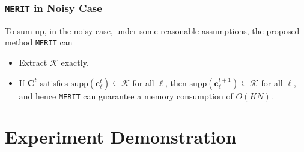 \documentclass[10pt,xcolor={usenames,dvipsnames,table}]{beamer}
\newcommand\coolover[2]{\mathrlap{\smash{\overbrace{\phantom{%
    \begin{matrix} #2 \end{matrix}}}^{\mbox{$#1$}}}}#2}
\newcommand{\tikzmarkx}[2]{\tikz[overlay,remember picture,
  baseline=(#1.base)] \node (#1) {#2};}
\newcommand{\Highlight}[1][submatrix]{%
    \tikz[overlay,remember picture]{
    \node[highlight,fit=(left.north west) (right.south east)] (#1) {};}
}
\begin{document}
%



\begin{frame}
    \frametitle{\texttt{MERIT} in Noisy Case}
    To sum up, in the noisy case, under some reasonable assumptions, the proposed method \texttt{MERIT} can
    \begin{itemize}
        \item Extract $\mathcal{K}$ exactly.
        \item If $\bm{C}^{t}$ satisfies $\text{supp}(\bm{c}_\ell^{t}) \subseteq \mathcal{K}$ for all $\ell$, then $\text{supp}(\bm{c}_\ell^{t+1}) \subseteq \mathcal{K}$ for all $\ell$, and hence \texttt{MERIT} can guarantee a memory consumption of $O(KN)$.
    \end{itemize}
\end{frame}



\section{Experiment Demonstration}%
\label{sec:real_demonstration}
\end{document}
